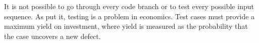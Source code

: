 \documentclass[12pt,a4paper,oneside,pdftex]{report}
\begin{document}
{{It is not possible to go through every code branch or to test every possible input sequence. As \citet{myers1976software} put it, testing is a problem in economics. Test cases must provide a maximum yield on investment, where yield is measured as the probability that the case uncovers a new defect. \citep{myers1976software}

\begin{comment}
Inconsistent interpretation of parameters or values
Violations of value domains or of capacity or size limits
Side-effects on parameters or resrouces
Missing or misunderstood functionality
Nonfinctional problems
Dynamic mismatches
\end{comment}

\begin{comment}
Interpretation
    wrong function - something else than specified
    extra function - more than what is expected/needed
    missing function - not all that is specified
Miscoded call (error which causes the developer to place the call instruction at the wrong point in the program)
    Extra instruction fault: the call instruction is on a path which should not have the call.
    Wrong placement fault: the call is at the wrong location on the path which should have the call instruction.
    Missing instruction fault: the call instruction is missing on the path which should have the call.
Interface error
    When stardards or agreements are violated
\end{comment}



\begin{comment}
% 
\chapter{Background}
\label{chapter:background}

The problem must have some background, otherwise it is not
interesting.  You can explain the background here. Probably you should
change the title to something that describes more the content of this
chapter. Background consists of information that help other masters of
the same degree program to understand the rest of the thesis.


\end{comment}}}
\end{document}
